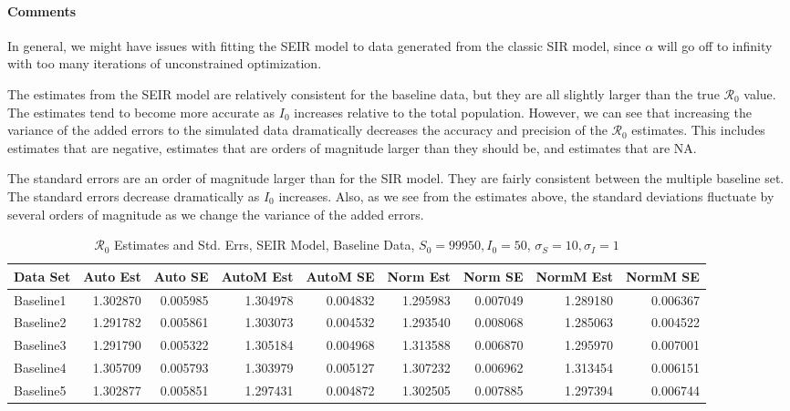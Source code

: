 \documentclass[12pt]{article}
\newcommand{\rr}{\ensuremath{\mathcal{R}_0}}
\begin{document}
\paragraph{Comments}

In general, we might have issues with fitting the SEIR model to data generated from the classic SIR model, since $\alpha$ will go off to infinity with too many iterations of unconstrained optimization. 

The estimates from the SEIR model are relatively consistent for the baseline data, but they are all slightly larger than the true $\rr$ value. The estimates tend to become more accurate as $I_0$ increases relative to the total population. However, we can see that increasing the variance of the added errors to the simulated data dramatically decreases the accuracy and precision of the $\rr$ estimates. This includes estimates that are negative, estimates that are orders of magnitude larger than they should be, and estimates that are NA.

The standard errors are an order of magnitude larger than for the SIR model. They are fairly consistent between the multiple baseline set. The standard errors decrease dramatically as $I_0$ increases. Also, as we see from the estimates above, the standard deviations fluctuate by several orders of magnitude as we change the variance of the added errors. 

\begin{table}[H]
	
	\caption{$\rr$ Estimates and Std. Errs, SEIR Model, 
		Baseline Data, $S_0 = 99950, I_0 = 50$, 
		$\sigma_S = 10, \sigma_I = 1$}
	\begin{footnotesize}
		\hskip -1cm
	\begin{tabular}{l|r|r|r|r|r|r|r|r}
		\hline
		Data Set & Auto Est & Auto SE & AutoM Est & AutoM SE & Norm Est & Norm SE & NormM Est & NormM SE\\
		\hline
		Baseline1 & 1.302870 & 0.005985 & 1.304978 & 0.004832 & 1.295983 & 0.007049 & 1.289180 & 0.006367\\
		\hline
		Baseline2 & 1.291782 & 0.005861 & 1.303073 & 0.004532 & 1.293540 & 0.008068 & 1.285063 & 0.004522\\
		\hline
		Baseline3 & 1.291790 & 0.005322 & 1.305184 & 0.004968 & 1.313588 & 0.006870 & 1.295970 & 0.007001\\
		\hline
		Baseline4 & 1.305709 & 0.005793 & 1.303979 & 0.005127 & 1.307232 & 0.006962 & 1.313454 & 0.006151\\
		\hline
		Baseline5 & 1.302877 & 0.005851 & 1.297431 & 0.004872 & 1.302505 & 0.007885 & 1.297394 & 0.006744\\
		\hline
	\end{tabular}
\end{footnotesize}
\end{table}
\end{document}
